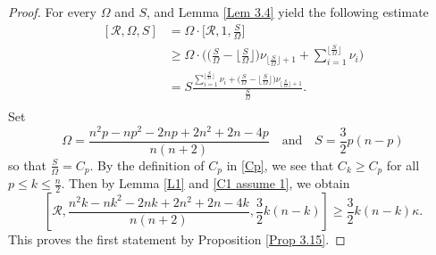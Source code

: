 \documentclass[12pt, twoside]{article}
\theoremstyle{definition}
\numberwithin{equation}{section}
\def\Om{\Omega}
\begin{document}
\begin{proof}
For every $\Omega$ and $S$,  \cite[Lemma 3.3]{NPW23} and Lemma \ref{Lem 3.4} yield the following estimate 
\begin{equation}\label{tri}
\begin{split}
[\mathcal{R},\Om,S]&=\Om\cdot \Big[\mathcal{R},1,\frac{S}{\Om}\Big]\\
&\geq \Om\cdot\Big(\big(\frac{S}{\Om}-\lfloor \frac{S}{\Om}\rfloor\big)\nu_{\lfloor \frac{S}{\Om}\rfloor+1}+\sum_{i=1}^{\lfloor \frac{S}{\Om}\rfloor}\nu_{i}\Big)\\
&=S\frac{\sum_{i=1}^{\lfloor \frac{S}{\Om}\rfloor}\nu_{i}+\big(\frac{S}{\Om}-\lfloor \frac{S}{\Om}\rfloor\big)\nu_{\lfloor \frac{S}{\Om}\rfloor+1}}{\frac{S}{\Om}}.\\
\end{split}
\end{equation}
Set 
\[
\Omega=\frac{n^2p-np^2-2np+2n^2+2n-4p}{n(n+2)} \quad \textrm{and} \quad S=\frac{3}{2}p(n-p)  
\]
so that $ \frac{S}{\Om}=C_{p}$. By the definition of $C_p$ in \eqref{Cp}, we see that $C_{k}\geq C_{p}$ for all $p\leq k\leq \frac{n}{2}$.  Then by Lemma \ref{L1} and \eqref{C1 assume 1}, we obtain 
\begin{equation*}
\left[\mathcal{R}, \frac{n^2k-nk^2-2nk+2n^2+2n-4k}{n(n+2)}, \frac{3}{2}k(n-k)\right] \geq \frac{3}{2}k(n-k)\kappa.
\end{equation*}
This proves the first statement by Proposition \ref{Prop 3.15}.


\end{proof}
\end{document}
